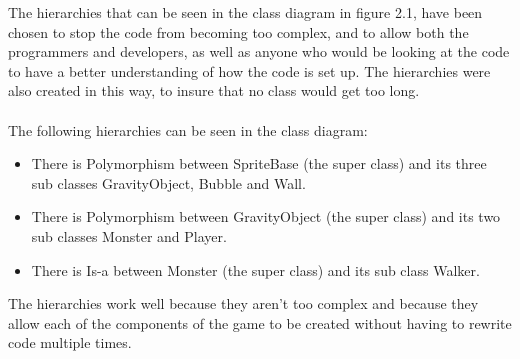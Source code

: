 \noindent The hierarchies that can be seen in the class diagram in figure 2.1, have been chosen to stop the code from becoming too complex, and to allow both the programmers and developers, as well as anyone who would be looking at the code to have a better understanding of how the code is set up. The hierarchies were also created in this way, to insure that no class would get too long.
\\\\
\noindent The following hierarchies can be seen in the class diagram:
\begin{itemize}
\itemsep0em 
\item There is Polymorphism between SpriteBase (the super class) and its three sub classes GravityObject, Bubble and Wall.
\item There is Polymorphism between GravityObject (the super class) and its two sub classes Monster and Player.
\item There is Is-a between Monster (the super class) and its sub class Walker.\\
\end{itemize} 

\noindent The hierarchies work well because they aren't too complex and because they allow each of the components of the game to be created without having to rewrite code multiple times.     